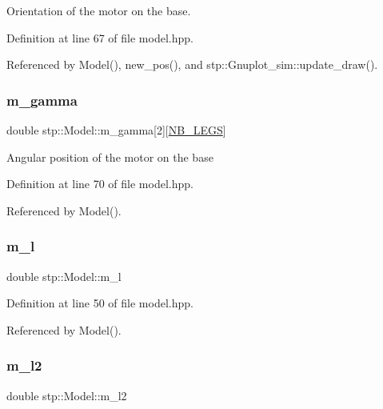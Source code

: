 Orientation of the motor on the base. 

Definition at line 67 of file model.\+hpp.



Referenced by Model(), new\+\_\+pos(), and stp\+::\+Gnuplot\+\_\+sim\+::update\+\_\+draw().

\mbox{\label{classstp_1_1_model_a60eab0062d4e65c720ed2ac39d51779b}} 
\subsubsection{\texorpdfstring{m\+\_\+gamma}{m\_gamma}}
{\footnotesize\ttfamily double stp\+::\+Model\+::m\+\_\+gamma\mbox{[}2\mbox{]}\mbox{[}\hyperlink{model_8hpp_ae44092ed043cb4350e2df47fdee890b9}{N\+B\+\_\+\+L\+E\+GS}\mbox{]}\hspace{0.3cm}{\ttfamily [protected]}}

Angular position of the motor on the base 

Definition at line 70 of file model.\+hpp.



Referenced by Model().

\mbox{\label{classstp_1_1_model_a4093789451a0491487090daa1c4c9b85}} 
\subsubsection{\texorpdfstring{m\+\_\+l}{m\_l}}
{\footnotesize\ttfamily double stp\+::\+Model\+::m\+\_\+l\hspace{0.3cm}{\ttfamily [protected]}}



Definition at line 50 of file model.\+hpp.



Referenced by Model().

\mbox{\label{classstp_1_1_model_a9a16f1c28c96157d51bedbf67a1a7a81}} 
\subsubsection{\texorpdfstring{m\+\_\+l2}{m\_l2}}
{\footnotesize\ttfamily double stp\+::\+Model\+::m\+\_\+l2\hspace{0.3cm}{\ttfamily [protected]}}

